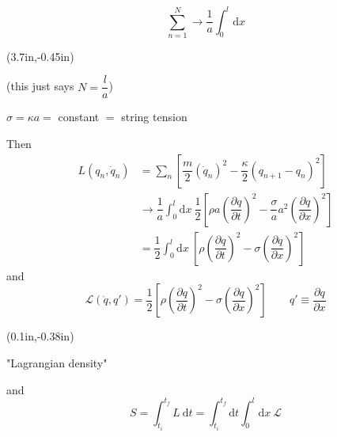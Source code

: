 \documentclass{article}
\begin{document}
\vspace*{-24pt} \begin{displaymath}
    \sum_{n=1}^{N} \rightarrow \dfrac{1}{a} \int_0^l \mathrm{d}x
\end{displaymath}
{%
\begin{textblock*}{3in}(3.7in,-0.45in)%
\begin{minipage}[h!]{3in}
    (this just says $N = \dfrac{l}{a}$)
\end{minipage}%
\end{textblock*}%
}

$\sigma = \kappa a =$ constant $=$ string tension

\noindent Then
\begin{align*}
    L ( q_n, \dot{q}_n ) &= \sum_n \left[ \dfrac{m}{2} ( \dot{q}_n )^2 - \dfrac{\kappa}{2} ( q_{n+1} - q_n )^2 \right] \\
    &\rightarrow \dfrac{1}{a} \int_0^l \mathrm{d}x~ \dfrac{1}{2} \left[ \rho a { \left( \dfrac{ \partial q }{ \partial t } \right) }^2 - \dfrac{\sigma}{a} a^2 { \left( \dfrac{ \partial q }{ \partial x } \right) }^2 \right] \\
    &= \dfrac{1}{2} \int_0^l \mathrm{d}x~ \left[ \rho { \left( \dfrac{ \partial q }{ \partial t } \right) }^2 - \sigma { \left( \dfrac{ \partial q }{ \partial x } \right) }^2 \right]
\end{align*}
and
\begin{equation*}
    \mathscr{L} ( \dot{q}, q' ) = \dfrac{1}{2} \left[ \rho { \left( \dfrac{ \partial q }{ \partial t } \right) }^2 - \sigma { \left( \dfrac{ \partial q }{ \partial x } \right) }^2 \right] %
    \qquad \boxed{ q' \equiv \dfrac{ \partial q }{ \partial x } }
\end{equation*}
{%
\begin{textblock*}{2in}(0.1in,-0.38in)%
\begin{minipage}[h!]{2in}
    "Lagrangian density"
\end{minipage}%
\end{textblock*}%
}%
and
\begin{equation*}
    S = \int_{t_i}^{t_f} L ~ \mathrm{d}t = \int_{t_i}^{t_f} \mathrm{d}t \int_0^l \mathrm{d}x~ \mathscr{L}
\end{equation*}

\end{document}
